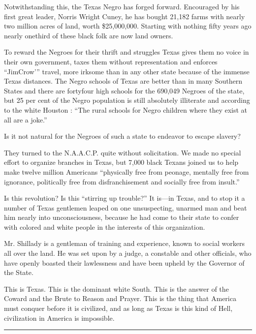 \documentclass[letterpaper,10pt,english]{jupyterBook}
\begin{document}
\sphinxAtStartPar
Notwithstanding this, the Texas Negro has forged forward. Encouraged by his first great leader, Norris Wright Cuney, he has bought 21,182 farms with nearly two million acres of land, worth \$25,000,000. Starting with nothing fifty years ago nearly one\sphinxhyphen{}third of these black folk are now land owners.

\sphinxAtStartPar
To reward the Negroes for their thrift and struggles Texas gives them no voice in their own government, taxes them without representation and enforces “Jim\sphinxhyphen{}Crow’” travel, more irksome than in any other state because of the immense Texas distances. The Negro schools of Texas are better than in many Southern States and there are forty\sphinxhyphen{}four high schools for the 690,049 Negroes of the state, but 25 per cent of the Negro population is still absolutely illiterate and according to the white Houston : “The rural schools for Negro children where they exist at all are a joke.”

\sphinxAtStartPar
Is it not natural for the Negroes of such a state to endeavor to escape slavery?

\sphinxAtStartPar
They turned to the N.A.A.C.P. quite without solicitation. We made no special effort to organize branches in Texas, but 7,000 black Texans joined us to help make twelve million Americans “physically free from peonage, mentally free from ignorance, politically free from disfranchisement and socially free from insult.”

\sphinxAtStartPar
Is this revolution? Is this “stirring up trouble?” It is—in Texas, and to stop it a number of Texas gentlemen leaped on one unsuspecting, unarmed man and beat him nearly into unconsciousness, because he had come to their state to confer with colored and white people in the interests of this organization.

\sphinxAtStartPar
Mr. Shillady is a gentleman of training and experience, known to social workers all over the land. He was set upon by a judge, a constable and other officials, who have openly boasted their lawlessness and have been upheld by the Governor of the State.

\sphinxAtStartPar
This is Texas. This is the dominant white South. This is the answer of the Coward and the Brute to Reason and Prayer. This is the thing that America must conquer before it is civilized, and as long as Texas is this kind of Hell, civilization in America is impossible.


\bigskip\hrule\bigskip
\end{document}
